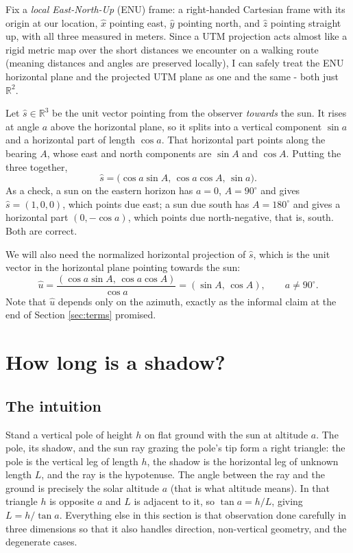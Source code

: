 \documentclass[11pt,a4paper]{article}
\theoremstyle{plain}
\theoremstyle{definition}
\theoremstyle{remark}
\begin{document}
Fix a \emph{local East-North-Up} (ENU) frame: a right-handed Cartesian frame with its origin at our location, $\hat{x}$ pointing east, $\hat{y}$ pointing north, and $\hat{z}$ pointing straight up, with all three measured in meters. Since a UTM projection acts almost like a rigid metric map over the short distances we encounter on a walking route (meaning distances and angles are preserved locally), I can safely treat the ENU horizontal plane and the projected UTM plane as one and the same - both just $\mathbb{R}^2$.

Let $\hat{s} \in \mathbb{R}^3$ be the unit vector pointing from the observer \emph{towards} the sun. It rises at angle $a$ above the horizontal plane, so it splits into a vertical component $\sin a$ and a horizontal part of length $\cos a$. That horizontal part points along the bearing $A$, whose east and north components are $\sin A$ and $\cos A$. Putting the three together,
$$\hat{s} = \big(\cos a \sin A, \, \cos a \cos A, \, \sin a\big).$$
As a check, a sun on the eastern horizon has $a = 0$, $A = 90^\circ$ and gives $\hat{s} = (1,0,0)$, which points due east; a sun due south has $A = 180^\circ$ and gives a horizontal part $(0, -\cos a)$, which points due north-negative, that is, south. Both are correct.

We will also need the normalized horizontal projection of $\hat{s}$, which is the unit vector in the horizontal plane pointing towards the sun:
$$\hat{u} = \frac{(\cos a \sin A, \, \cos a \cos A)}{\cos a} = (\sin A, \, \cos A), \qquad a \neq 90^\circ.$$
Note that $\hat{u}$ depends only on the azimuth, exactly as the informal claim at the end of Section \ref{sec:terms} promised.

\section{How long is a shadow?}
\label{sec:length}

\subsection{The intuition}

Stand a vertical pole of height $h$ on flat ground with the sun at altitude $a$. The pole, its shadow, and the sun ray grazing the pole's tip form a right triangle: the pole is the vertical leg of length $h$, the shadow is the horizontal leg of unknown length $L$, and the ray is the hypotenuse. The angle between the ray and the ground is precisely the solar altitude $a$ (that is what altitude means). In that triangle $h$ is opposite $a$ and $L$ is adjacent to it, so $\tan a = h/L$, giving $L = h/\tan a$. Everything else in this section is that observation done carefully in three dimensions so that it also handles direction, non-vertical geometry, and the degenerate cases.
\end{document}
